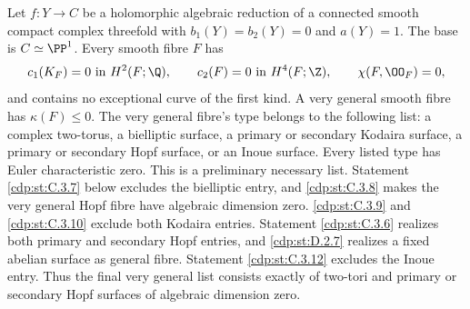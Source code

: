 \begin{proposition}\hypertarget{tag-01F4}{}\label{cdp:st:C.3.1}


Let $f:Y\to C$ be a holomorphic algebraic reduction of a connected
smooth compact complex threefold with $b_1(Y)=b_2(Y)=0$ and $a(Y)=1$.
The base is $C\simeq\PP^1$. Every smooth fibre $F$ has
\[
 c_1(K_F)=0\text{ in }H^2(F;\Q),\qquad
 c_2(F)=0\text{ in }H^4(F;\Z),\qquad
 \chi(F,\OO_F)=0,
\]
and contains no exceptional curve of the first kind. A very general
smooth fibre has $\kappa(F)\leq0$. The very general fibre's type belongs to the following
list: a complex two-torus, a bielliptic surface, a primary or secondary
Kodaira surface, a primary or secondary Hopf surface, or an Inoue
surface. Every listed type has Euler characteristic zero. This is a
preliminary necessary list. Statement \ref{cdp:st:C.3.7} below excludes the
bielliptic entry, and \ref{cdp:st:C.3.8} makes the very general Hopf fibre have
algebraic dimension zero. \ref{cdp:st:C.3.9} and \ref{cdp:st:C.3.10} exclude both Kodaira
entries. Statement \ref{cdp:st:C.3.6} realizes both primary and secondary Hopf
entries, and \ref{cdp:st:D.2.7} realizes a fixed abelian surface as general
fibre. Statement \ref{cdp:st:C.3.12} excludes the Inoue entry. Thus the
final very general list consists exactly of two-tori and
primary or secondary Hopf surfaces of algebraic dimension zero.
\end{proposition}

